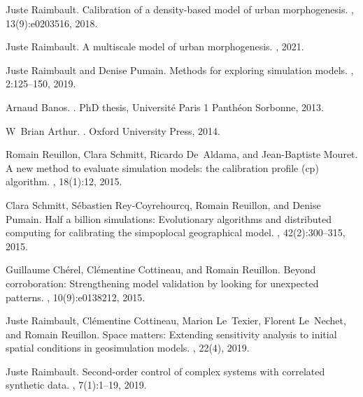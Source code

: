 \begin{thebibliography}{10}
Juste Raimbault.
\newblock Calibration of a density-based model of urban morphogenesis.
, 13(9):e0203516, 2018.

Juste Raimbault.
\newblock A multiscale model of urban morphogenesis.
, 2021.

Juste Raimbault and Denise Pumain.
\newblock Methods for exploring simulation models.
, 2:125--150,
  2019.

Arnaud Banos.
.
\newblock PhD thesis, Universit{\'e} Paris 1 Panth{\'e}on Sorbonne, 2013.

W~Brian Arthur.
.
\newblock Oxford University Press, 2014.

Romain Reuillon, Clara Schmitt, Ricardo De~Aldama, and Jean-Baptiste Mouret.
\newblock A new method to evaluate simulation models: the calibration profile
  (cp) algorithm.
,
  18(1):12, 2015.

Clara Schmitt, S{\'e}bastien Rey-Coyrehourcq, Romain Reuillon, and Denise
  Pumain.
\newblock Half a billion simulations: Evolutionary algorithms and distributed
  computing for calibrating the simpoplocal geographical model.
,
  42(2):300--315, 2015.

Guillaume Ch{\'e}rel, Cl{\'e}mentine Cottineau, and Romain Reuillon.
\newblock Beyond corroboration: Strengthening model validation by looking for
  unexpected patterns.
, 10(9):e0138212, 2015.

Juste Raimbault, Cl{\'e}mentine Cottineau, Marion Le~Texier, Florent Le~Nechet,
  and Romain Reuillon.
\newblock Space matters: Extending sensitivity analysis to initial spatial
  conditions in geosimulation models.
, 22(4),
  2019.

Juste Raimbault.
\newblock Second-order control of complex systems with correlated synthetic
  data.
, 7(1):1--19, 2019.


\end{thebibliography}
